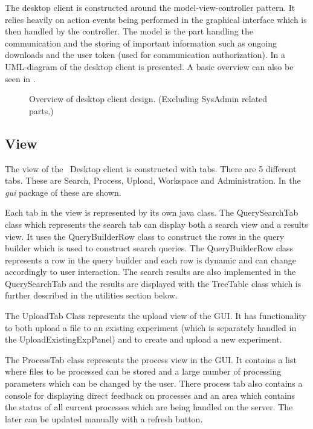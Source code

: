 The desktop client is constructed around the model-view-controller pattern. It
relies heavily on action events being performed in the graphical interface which
is then handled by the controller. The model is the part handling the
communication and the storing of important information such as ongoing downloads
and the user token (used for communication authorization). In
 a UML-diagram of the desktop client is presented. A basic
overview can also be seen in .

\begin{figure}[hbt!]
\caption{Overview of desktop client design. (Excluding SysAdmin related parts.)}
\label{fig:des_overviewUML}
\end{figure}


\subsection{View}
The view of the \appName\ Desktop client is constructed with tabs. There are 5 different tabs. These are Search, Process, Upload, Workspace and Administration. In the \textit{gui} package of  these are shown.

Each tab in the view is represented by its own java class. The QuerySearchTab class which represents the search tab can display both a search view and a results view. It uses the QueryBuilderRow class to construct the rows in the query builder which is used to construct search queries. The QueryBuilderRow class represents a row in the query builder and each row is dynamic and can change accordingly to user interaction. The search results are also implemented in the QuerySearchTab and the results are displayed with the TreeTable class which is further described in the utilities section below.

The UploadTab Class represents the upload view of the GUI. It has functionality to both upload a file to an existing experiment (which is separately handled in the UploadExistingExpPanel) and to create and upload a new experiment.

The ProcessTab class represents the process view in the GUI. It contains a list where files to be processed can be stored and a large number of processing parameters which can be changed by the user. There process tab also contains a console for displaying direct feedback on processes and an area which contains the status of all current processes which are being handled on the server. The later can be updated manually with a refresh button.

